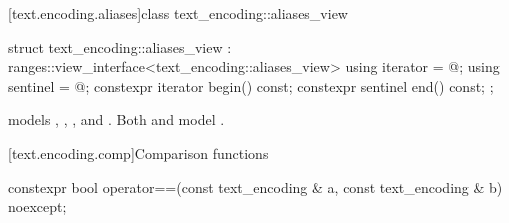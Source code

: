 \documentclass{wg21}
\begin{document}
\begin{addedblock}
%


[text.encoding.aliases]{class text_encoding::aliases_view}

\begin{codeblock}
struct text_encoding::aliases_view : ranges::view_interface<text_encoding::aliases_view> {
    using iterator = @\impdef@;
    using sentinel = @\impdef@;
    constexpr iterator begin() const;
    constexpr sentinel end() const;
};
\end{codeblock}

 models , , , and .
Both  and  model .


%
%


[text.encoding.comp]{Comparison functions}

\begin{itemdecl}
    constexpr bool operator==(const text_encoding & a, const text_encoding & b) noexcept;
\end{itemdecl}

\begin{itemdescr}
    \returns


\end{itemdescr}
\end{addedblock}
\end{document}
